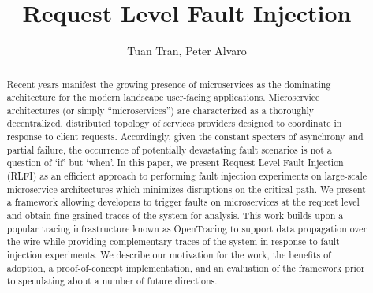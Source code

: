 \documentclass[letterpaper,twocolumn,10pt]{article}
\begin{document}
\date{}

\title{\Large \bf Request Level Fault Injection}


\author{Tuan Tran, Peter Alvaro}

\maketitle


\begin{abstract}
Recent years manifest the growing presence of microservices as the dominating architecture for the modern landscape user-facing applications. Microservice architectures (or simply ``microservices'') are characterized as a thoroughly decentralized, distributed topology of services providers designed to coordinate in response to client requests. Accordingly, given the constant specters of asynchrony and partial failure, the occurrence of potentially devastating fault scenarios is not a question of `if' but `when'. In this paper, we present Request Level Fault Injection (RLFI) as an efficient approach to performing fault injection experiments on large-scale microservice architectures which minimizes disruptions on the critical path. We present a framework allowing developers to trigger faults on microservices at the request level and obtain fine-grained traces of the system for analysis. This work builds upon a popular tracing infrastructure known as OpenTracing\cite{opentracing:doc} to support data propagation over the wire while providing complementary traces of the system in response to fault injection experiments. We describe our motivation for the work, the benefits of adoption, a proof-of-concept implementation, and an evaluation of the framework prior to speculating about a number of future directions.
\end{abstract}


\end{document}

